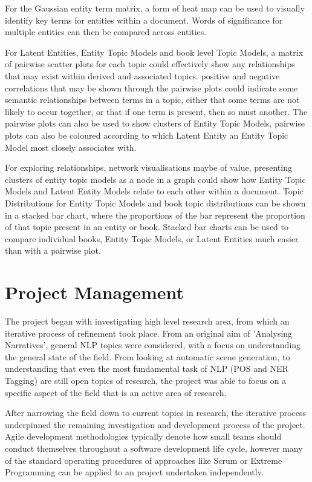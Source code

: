 \documentclass[10pt]{report}
\begin{document}
For the Gaussian entity term matrix, a form of heat map can be used to visually identify key terms for entities within a document. Words of significance for multiple entities can then be compared across entities.

For Latent Entities, Entity Topic Models and book level Topic Models, a matrix of pairwise scatter plots for each topic could effectively show any relationships that may exist within derived and associated topics. positive and negative correlations that may be shown through the pairwise plots could indicate some semantic relationships between terms in a topic, either that some terms are not likely to occur together, or that if one term is present, then so must another. The pairwise plots can also be used to show clusters of Entity Topic Models, pairwise plots can also be coloured according to which Latent Entity an Entity Topic Model most closely associates with.

For exploring relationships, network visualisations maybe of value, presenting clusters of entity topic models as a node in a graph could show how Entity Topic Models and Latent Entity Models relate to each other within a document. Topic Distributions for Entity Topic Models and book topic distributions can be shown in a stacked bar chart, where the proportions of the bar represent the proportion of that topic present in an entity or book. Stacked bar charts can be used to compare individual books, Entity Topic Models, or Latent Entities much easier than with a pairwise plot.

\section{Project Management}
The project began with investigating high level research area, from which an iterative process of refinement took place. From an original aim of 'Analysing Narratives', general NLP topics were considered, with a focus on understanding the general state of the field. From looking at automatic scene generation, to understanding that even the most fundamental task of NLP (POS and NER Tagging) are still open topics of research, the project was able to focus on a specific aspect of the field that is an active area of research.

After narrowing the field down to current topics in research, the iterative process underpinned the remaining investigation and development process of the project. Agile development methodologies typically denote how small teams should conduct themselves throughout a software development life cycle, however many of the standard operating procedures of approaches like Scrum or Extreme Programming can be applied to an project undertaken independently.
\end{document}
